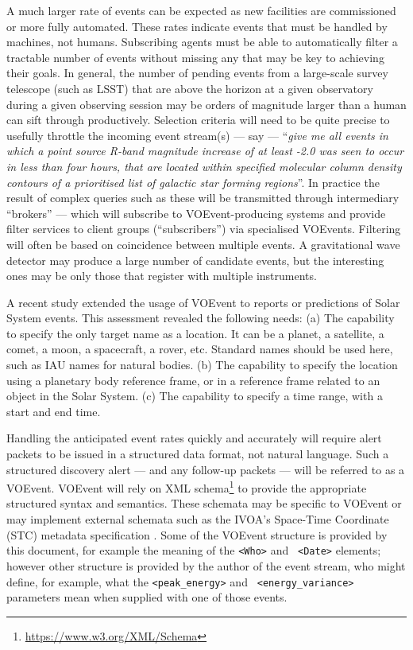 \documentclass[11pt,a4paper]{ivoa}
\begin{document}
A much larger rate of events can be expected as new facilities are commissioned
or more fully automated. These rates indicate events that must be handled by
machines, not humans. Subscribing agents must be able to automatically filter a
tractable number of events without missing any that may be key to achieving
their goals. In general, the number of pending events from a large-scale survey
telescope (such as LSST) that are above the horizon at a given observatory
during a given observing session may be orders of magnitude larger than a human
can sift through productively. Selection criteria will need to be quite precise
to usefully throttle the incoming event stream(s) --- say --- ``\emph{give me
all events in which a point source R-band magnitude increase of at least -2.0
was seen to occur in less than four hours, that are located within specified
molecular column density contours of a prioritised list of galactic star forming
regions}''. In practice the result of complex queries such as these will be
transmitted through intermediary ``brokers'' --- which will subscribe to
VOEvent-producing systems and provide filter services to client groups
(``subscribers'') via specialised VOEvents. Filtering will often be based on
coincidence between multiple events. A gravitational wave detector may produce
a large number of candidate events, but the interesting ones may be only those
that register with multiple instruments.

A recent study \citep{2018arXiv181112680C} extended the usage of VOEvent to
reports or predictions of Solar System events. This assessment revealed the
following needs: (a) The capability to specify the only target name as a
location. It can be a planet, a satellite, a comet, a moon, a spacecraft, a
rover, etc. Standard names should be used here, such as IAU names for natural
bodies. (b) The capability to specify the location using a planetary body
reference frame, or in a reference frame related to an object in the Solar
System. (c) The capability to specify a time range, with a start and end time.

Handling the anticipated event rates quickly and accurately will require alert
packets to be issued in a structured data format, not natural language. Such a
structured discovery alert --- and any follow-up packets --- will be referred
to as a VOEvent. VOEvent will rely on XML schema\footnote{
\url{https://www.w3.org/XML/Schema}} to provide the appropriate structured
syntax and semantics. These schemata may be specific to VOEvent or may implement
external schemata such as the IVOA's Space-Time Coordinate (STC) metadata
specification \citep{2007ivoa.spec.1030R}. Some of the VOEvent structure is
provided by this document, for example the meaning of the {\tt <Who>} and {\tt
<Date>} elements; however other structure is provided by the author of the event
stream, who might define, for example, what the {\tt <peak\_energy>} and {\tt
<energy\_variance>} parameters mean when supplied with one of those events.
\end{document}
